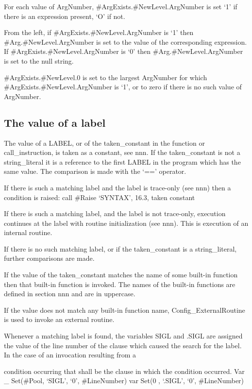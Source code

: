 For each value of ArgNumber, \#ArgExists.\#NewLevel.ArgNumber is set `1'
if there is an expression present, `O' if not.

From the left, if \#ArgExists.\#NewLevel.ArgNumber is `1' then
\#Arg.\#NewLevel.ArgNumber is set to the value of the corresponding
expression. If \#ArgExists.\#NewLevel.ArgNumber is `0' then
\#Arg.\#NewLevel.ArgNumber is set to the null string.

\#ArgExists.\#NewLevel.0 is set to the largest ArgNumber for which
\#ArgExists.\#NewLevel.ArgNumber is `1', or to zero if there is no such
value of ArgNumber.

\subsection{The value of a label}\label{the-value-of-a-label}

The value of a LABEL, or of the taken\_constant in the function or
call\_instruction, is taken as a constant, see nnn. If the
taken\_constant is not a string\_literal it is a reference to the first
LABEL in the program which has the same value. The comparison is made
with the `==' operator.

If there is such a matching label and the label is trace-only (see nnn)
then a condition is raised: call \#Raise `SYNTAX', 16.3, taken constant

If there is such a matching label, and the label is not trace-only,
execution continues at the label with routine initialization (see nnn).
This is execution of an internal routine.

If there is no such matching label, or if the taken\_constant is a
string\_literal, further comparisons are made.

If the value of the taken\_constant matches the name of some built-in
function then that built-in function is invoked. The names of the
built-in functions are defined in section nnn and are in uppercase.

If the value does not match any built-in function name,
Config\_ExternalRoutine is used to invoke an external routine.

Whenever a matching label is found, the variables SIGL and .SIGL are
assigned the value of the line number of the clause which caused the
search for the label. In the case of an invocation resulting from a

condition occurring that shall be the clause in which the condition
occurred. Var \_ Set(\#Pool, `SIGL', `0', \#LineNumber) var Set(0 ,
`.SIGL', `0', \#LineNumber)


